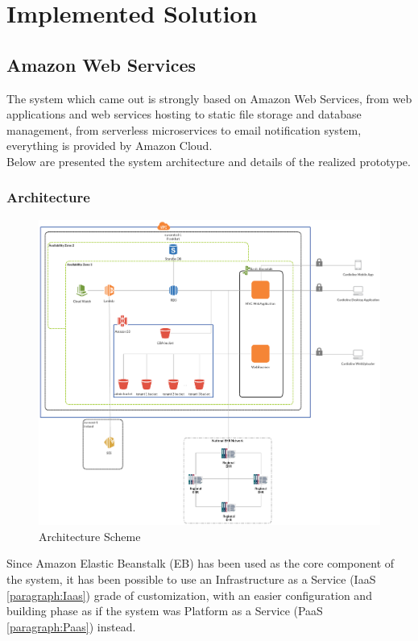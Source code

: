 \chapter{Implemented Solution}

\section{Amazon Web Services}
The system which came out is strongly based on Amazon Web Services, from web applications and web services hosting to static file storage and database management, from serverless microservices to email notification system, everything is provided by Amazon Cloud.\\
Below are presented the system architecture and details of the realized prototype.
\subsection{Architecture}
\begin{figure}[h]
    \includegraphics[width=\textwidth]{img/architecture}
    \caption{Architecture Scheme}
    \label{fig:architecture}
\end{figure}
Since Amazon Elastic Beanstalk (EB) has been used as the core component of the system, it has been possible to use an Infrastructure as a Service (IaaS \ref{paragraph:Iaas}) grade of customization, with an easier configuration and building phase as if the system was Platform as a Service (PaaS \ref{paragraph:Paas}) instead.\\
